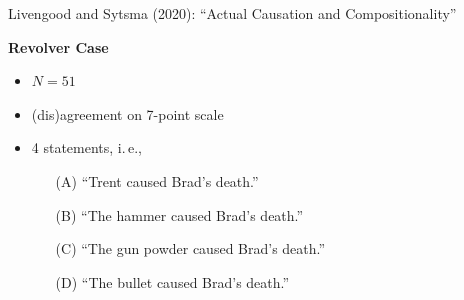 \documentclass[xcolor=table,9pt,aspectratio=169]{beamer}
\begin{document}
\begin{frame}{\vspace*{10mm}Livengood and Sytsma (2020): ``Actual Causation and Compositionality''}
\vspace*{-5mm}
\begin{multicols}{2}
\textbf{Revolver Case}
\begin{itemize}
   \item $N=51$
   \item (dis)agreement on 7-point scale
   \item 4 statements, i.\,e.,
   \begin{itemize}
      \item[(A)] ``Trent caused Brad's death.''
      \item[(B)] ``The hammer caused Brad's death.''
      \item[(C)] ``The gun powder caused Brad's death.''
      \item[(D)] ``The bullet caused Brad's death.''
   \end{itemize}
\end{itemize}
\vfill
\begin{center}
\end{center}
\end{multicols}
\end{frame}
\end{document}
